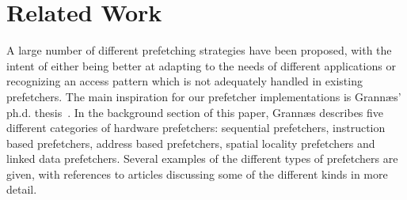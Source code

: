 
\section{Related Work}
\label{sec:relatedWork}

A large number of different prefetching strategies have been proposed,
with the intent of either being better at adapting to the needs of
different applications or recognizing an access pattern which is not
adequately handled in existing prefetchers. The main inspiration for our prefetcher implementations is
Grannæs' ph.d. thesis~\cite{Grannas}. In the background section of this
paper, Grannæs describes five different categories of hardware
prefetchers: sequential prefetchers, instruction based prefetchers,
address based prefetchers, spatial locality prefetchers and linked
data prefetchers. Several examples of the different types of
prefetchers are given, with references to articles discussing some of
the different kinds in more detail. 
